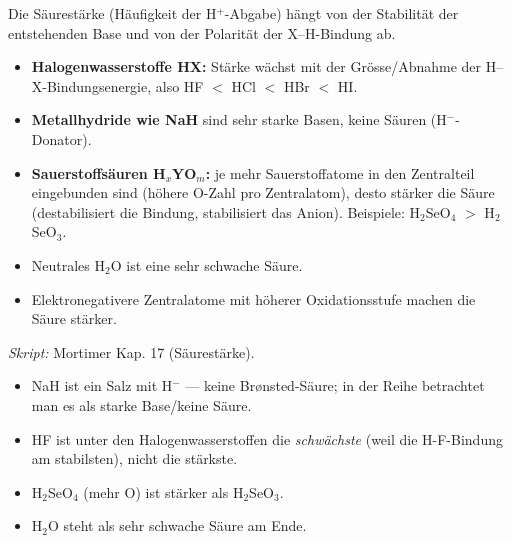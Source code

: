 

Die Säurestärke (Häufigkeit der H$^+$-Abgabe) hängt von der Stabilität der
entstehenden Base und von der Polarität der X--H-Bindung ab.

\begin{werkzeugkasten}
\begin{itemize}
  \item \textbf{Halogenwasserstoffe HX:} Stärke wächst mit der Grösse/Abnahme
        der H--X-Bindungsenergie, also HF $<$ HCl $<$ HBr $<$ HI.
  \item \textbf{Metallhydride wie NaH} sind sehr starke Basen, keine Säuren
        (H$^-$-Donator).
  \item \textbf{Sauerstoffsäuren H$_x$YO$_m$:} je mehr Sauerstoffatome in den
        Zentralteil eingebunden sind (höhere O-Zahl pro Zentralatom), desto
        stärker die Säure (destabilisiert die Bindung, stabilisiert das
        Anion). Beispiele: H$_2$SeO$_4$ $>$ H$_2$SeO$_3$.
  \item Neutrales H$_2$O ist eine sehr schwache Säure.
  \item Elektronegativere Zentralatome mit höherer Oxidationsstufe machen
        die Säure stärker.
\end{itemize}
\textit{Skript:} Mortimer Kap. 17 (Säurestärke).
\end{werkzeugkasten}

\begin{achtung}
\begin{itemize}
  \item NaH ist ein Salz mit H$^-$ --- keine Brønsted-Säure; in der Reihe
        betrachtet man es als starke Base/keine Säure.
  \item HF ist unter den Halogenwasserstoffen die \emph{schwächste} (weil
        die H-F-Bindung am stabilsten), nicht die stärkste.
  \item H$_2$SeO$_4$ (mehr O) ist stärker als H$_2$SeO$_3$.
  \item H$_2$O steht als sehr schwache Säure am Ende.
\end{itemize}
\end{achtung}
